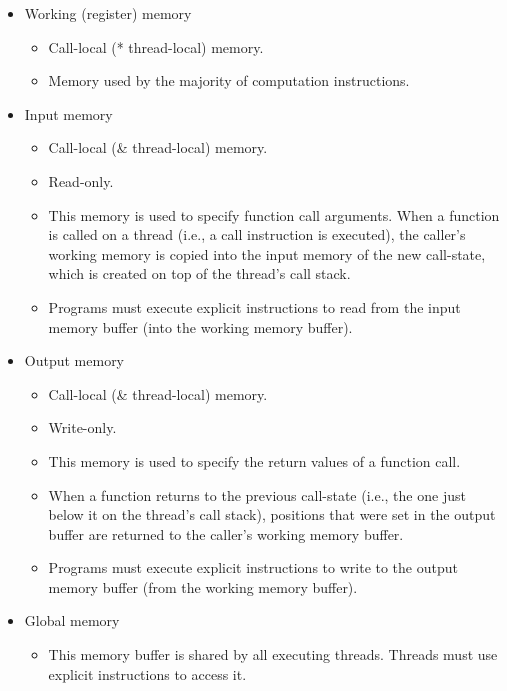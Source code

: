 \documentclass[
]{book}
\providecommand{\tightlist}{%
  \setlength{\itemsep}{0pt}\setlength{\parskip}{0pt}}
\begin{document}
\begin{itemize}
\tightlist
\item
  Working (register) memory

  \begin{itemize}
  \tightlist
  \item
    Call-local (* thread-local) memory.
  \item
    Memory used by the majority of computation instructions.
  \end{itemize}
\item
  Input memory

  \begin{itemize}
  \tightlist
  \item
    Call-local (\& thread-local) memory.
  \item
    Read-only.
  \item
    This memory is used to specify function call arguments. When a function is called on a thread (i.e.,
    a call instruction is executed), the caller's working memory is copied into the input memory of
    the new call-state, which is created on top of the thread's call stack.
  \item
    Programs must execute explicit instructions to read from the input memory buffer (into the working
    memory buffer).
  \end{itemize}
\item
  Output memory

  \begin{itemize}
  \tightlist
  \item
    Call-local (\& thread-local) memory.
  \item
    Write-only.
  \item
    This memory is used to specify the return values of a function call.
  \item
    When a function returns to the previous call-state (i.e., the one just below it on the thread's
    call stack), positions that were set in the output buffer are returned to the caller's working memory
    buffer.
  \item
    Programs must execute explicit instructions to write to the output memory buffer (from the working
    memory buffer).
  \end{itemize}
\item
  Global memory

  \begin{itemize}
  \tightlist
  \item
    This memory buffer is shared by all executing threads. Threads must use explicit instructions to access it.
  \end{itemize}
\end{itemize}
\end{document}
